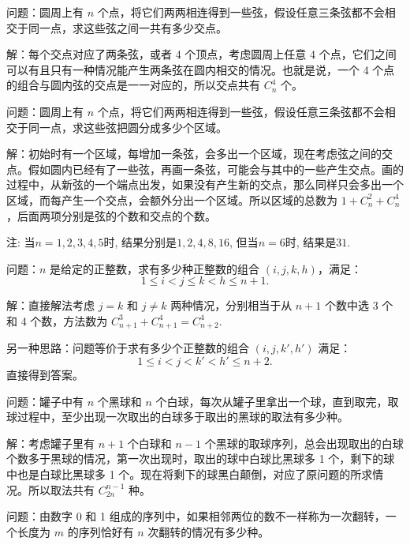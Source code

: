 \newpage

问题：圆周上有 $ n $ 个点，将它们两两相连得到一些弦，假设任意三条弦都不会相交于同一点，求这些弦之间一共有多少交点。

解：每个交点对应了两条弦，或者 4 个顶点，考虑圆周上任意 4 个点，它们之间可以有且只有一种情况能产生两条弦在圆内相交的情况。也就是说，一个 4 个点的组合与圆内弦的交点是一一对应的，所以交点共有 $ C_n^4 $ 个。

\vbox{}

问题：圆周上有 $ n $ 个点，将它们两两相连得到一些弦，假设任意三条弦都不会相交于同一点，求这些弦把圆分成多少个区域。

解：初始时有一个区域，每增加一条弦，会多出一个区域，现在考虑弦之间的交点。假如圆内已经有了一些弦，再画一条弦，可能会与其中的一些产生交点。画的过程中，从新弦的一个端点出发，如果没有产生新的交点，那么同样只会多出一个区域，而每产生一个交点，会额外分出一个区域。所以区域的总数为 $ 1 + C_n^2 + C_n^4 $，后面两项分别是弦的个数和交点的个数。

注: 当$n=1,2,3,4,5$时, 结果分别是$1, 2, 4, 8, 16$, 但当$n=6$时, 结果是$31$.


\newpage


问题：$ n $ 是给定的正整数，求有多少种正整数的组合 $ (i,j,k,h) $，满足：
\[ 1\le i < j \le k < h \le n+1 .\]

解：直接解法考虑 $ j=k $ 和 $ j\neq k $ 两种情况，分别相当于从 $ n+1  $ 个数中选 3 个和 4 个数，方法数为 $ C_{n+1}^3 + C_{n+1}^4 = C_{n+2}^4 $.

另一种思路：问题等价于求有多少个正整数的组合 $ (i,j,k',h') $ 满足：
\[ 1\le i < j < k' < h' \le n+2 .\]
直接得到答案。


\vbox{}

问题：罐子中有 $ n $ 个黑球和 $ n $ 个白球，每次从罐子里拿出一个球，直到取完，取球过程中，至少出现一次取出的白球多于取出的黑球的取法有多少种。

解：考虑罐子里有 $ n + 1 $ 个白球和 $ n - 1 $ 个黑球的取球序列，总会出现取出的白球个数多于黑球的情况，第一次出现时，取出的球中白球比黑球多 1 个，剩下的球中也是白球比黑球多 1 个。现在将剩下的球黑白颠倒，对应了原问题的所求情况。所以取法共有 $ C_{2n}^{n-1} $ 种。

\vbox{}

问题：由数字 0 和 1 组成的序列中，如果相邻两位的数不一样称为一次翻转，一个长度为 $ m $ 的序列恰好有 $ n $ 次翻转的情况有多少种。

